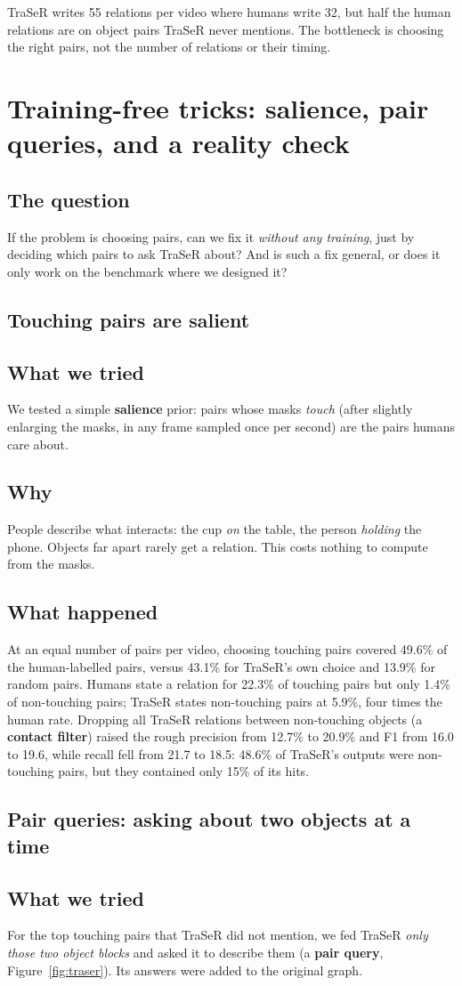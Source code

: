 \documentclass[11pt,openany]{book}
\newcommand{\qsec}{\section*{The question}}
\newcommand{\tsec}{\section*{What we tried}}
\newcommand{\wsec}{\section*{Why}}
\newcommand{\hsec}{\section*{What happened}}
\begin{document}
\begin{summarybox}
TraSeR writes 55 relations per video where humans write 32, but half the human relations are on object pairs TraSeR never
mentions. The bottleneck is choosing the right pairs, not the number of relations or their timing.
\end{summarybox}

\chapter[Training-free tricks and a reality check]{Training-free tricks: salience, pair queries, and a reality check}\label{ch:salience}

\qsec
If the problem is choosing pairs, can we fix it \emph{without any training}, just by deciding which pairs to ask TraSeR about?
And is such a fix general, or does it only work on the benchmark where we designed it?

\section{Touching pairs are salient}
\tsec
We tested a simple \textbf{salience} prior: pairs whose masks \emph{touch} (after slightly enlarging the masks, in any frame sampled
once per second) are the pairs humans care about.

\wsec
People describe what interacts: the cup \emph{on} the table, the person \emph{holding} the phone. Objects far apart rarely get a
relation. This costs nothing to compute from the masks.

\hsec
At an equal number of pairs per video, choosing touching pairs covered 49.6\% of the human-labelled pairs, versus 43.1\% for
TraSeR's own choice and 13.9\% for random pairs. Humans state a relation for 22.3\% of touching pairs but only 1.4\% of
non-touching pairs; TraSeR states non-touching pairs at 5.9\%, four times the human rate. Dropping all TraSeR relations between
non-touching objects (a \textbf{contact filter}) raised the rough precision from 12.7\% to 20.9\% and F1 from 16.0 to 19.6, while
recall fell from 21.7 to 18.5: 48.6\% of TraSeR's outputs were non-touching pairs, but they contained only 15\% of its hits.

\section{Pair queries: asking about two objects at a time}
\tsec
For the top touching pairs that TraSeR did not mention, we fed TraSeR \emph{only those two object blocks} and asked it to describe
them (a \textbf{pair query}, Figure~\ref{fig:traser}). Its answers were added to the original graph.
\end{document}
